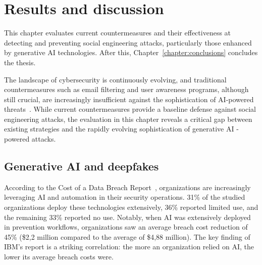 
\chapter{Results and discussion\label{chapter:discussion}}
\begin{comment}
- viimeisteltyä kirjakieltä, ei alan slangia. "does not", ei "doesn't"
- tietoturvakoulutus työajalla, EI omalla ajalla
- armeijassa saa vapaata hyvästä suorituksesta ammunnoissa. joku bonus gamifikaation kautta?
- employees can work from home, mention this? extra challenges for cybersecurity
- oman tietoturvatiimin tekemänä tai kolmannen osapuolen palveluna
- post-its and posters will likely be tuned out by the brain eventually. thus they must be kept fresh. luckily DALL-E can easily create such content, as often as needed
- orvot aliluvut merkki jäsentelyongelmasta, orvot luvunalotusrivit pakotetaan muun tekstin kanssa samalle sivulle
- muistuttamalla tärkeimmistä havainnoista luvun lopussa tavoitteeseen suhteutettuna
- Teknisten johtopäätösten tuoma impakti
- muistuttaa mieleen tutkimuskysymyksen, mainitsee tärkeimmät tulokset ja niiden perusteet
- keskittyy impaktiin ja esimerkiksi suosituksiin.
- ei pelkästään summeeraa luku kerrallaan aiempaa tekstiä
\end{comment}

This chapter evaluates current countermeasures and their effectiveness at detecting and preventing social engineering attacks, particularly those enhanced by generative AI technologies. After this, Chapter~\ref{chapter:conclusions} concludes the thesis.

The landscape of cybersecurity is continuously evolving, and traditional countermeasures such as email filtering and user awareness programs, although still crucial, are increasingly insufficient against the sophistication of AI-powered threats~\citep{fakhouri_AI_Driven_Solutions_SE_Attacks_2024}. While current countermeasures provide a baseline defense against social engineering attacks, the evaluation in this chapter reveals a critical gap between existing strategies and the rapidly evolving sophistication of generative AI -powered attacks. 


\section{Generative AI and deepfakes}
\begin{comment}
\end{comment}

According to the Cost of a Data Breach Report~\citep{ibm_Cost_Data_Breach_Report_2024}, organizations are increasingly leveraging AI and automation in their security operations. 31\% of the studied organizations deploy these technologies extensively, 36\% reported limited use, and the remaining 33\% reported no use. Notably, when AI was extensively deployed in prevention workflows, organizations saw an average breach cost reduction of 45\% (\$2,2 million compared to the average of \$4,88 million). The key finding of IBM's report is a striking correlation: the more an organization relied on AI, the lower its average breach costs were.

